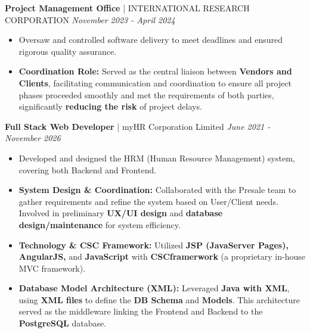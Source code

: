 \documentclass[11pt, a4paper]{article}
\newcommand{\jobentry}[3]{
    \vspace{0.7em} %
    \textbf{\color{black}#1} | #2 \hfill \emph{#3}
}
\begin{document}
\jobentry{Project Management Office}{INTERNATIONAL RESEARCH CORPORATION}{November 2023 - April 2024}
\begin{itemize}
    \item Oversaw and controlled software delivery to meet deadlines and ensured rigorous quality assurance.
    \item \textbf{Coordination Role:} Served as the central liaison between \textbf{Vendors and Clients}, facilitating communication and coordination to ensure all project phases proceeded smoothly and met the requirements of both parties, significantly \textbf{reducing the risk} of project delays.
\end{itemize}
\vspace{0.6em}

\jobentry{Full Stack Web Developer}{myHR Corporation Limited}{June 2021 - November 2026}
\begin{itemize}
    \item Developed and designed the HRM (Human Resource Management) system, covering both Backend and Frontend.
    \item \textbf{System Design \& Coordination:} Collaborated with the Presale team to gather requirements and refine the system based on User/Client needs. Involved in preliminary \textbf{UX/UI design} and \textbf{database design/maintenance} for system efficiency.
    \item \textbf{Technology \& CSC Framework:} Utilized \textbf{JSP (JavaServer Pages), AngularJS,} and \textbf{JavaScript} with \textbf{CSCframerwork} (a proprietary in-house MVC framework).
    \item \textbf{Database Model Architecture (XML):} Leveraged \textbf{Java with XML}, using \textbf{XML files} to define the \textbf{DB Schema} and \textbf{Models}. This architecture served as the middleware linking the Frontend and Backend to the \textbf{PostgreSQL} database.
\end{itemize}
\vspace{0.5em}
\end{document}

